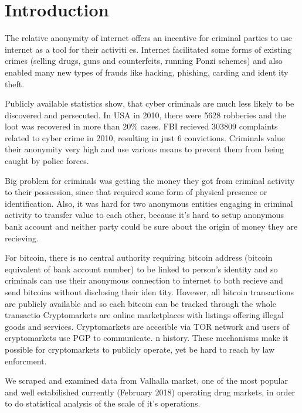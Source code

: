 \documentclass[
  digital, %
  table,   %
  lof,     %
  lot,     %
  oneside
]{fithesis3}
\begin{document}
\chapter{Introduction}

The relative anonymity of internet offers an incentive for criminal parties to use internet as a tool for their activiti
es.
Internet facilitated some forms of existing crimes (selling drugs, guns and
counterfeits, running Ponzi schemes) and also enabled many new types of frauds like hacking, phishing, carding and ident
ity theft.

Publicly available statistics show, that cyber criminals are much
 less likely to be discovered and persecuted.
 In USA in 2010, there were 5628 robberies and the loot was recovered in more than 20\% cases. \parencite{fbi10} 
 FBI recieved 303809 complaints related to cyber crime in 2010, resulting in just 6 convictions. \parencite{fbcyber} 
Criminals value their anonymity very high and use various means to prevent them from being caught by police forces.
\parencite{tzanetakis2016transparency}
\parencite{van2013surfing}
\parencite{aldridge2014not}

Big problem for criminals was getting the money they got from criminal activity to their possession,
since that required some form of physical presence or identification.
Also, it was hard for two anonymous entities engaging in criminal activity to transfer value to each other,
 because it's hard to setup anonymous bank account and neither party could be sure about the origin of
 money they are recieving.

For bitcoin, there is no central authority requiring bitcoin address
(bitcoin equivalent of bank account number) to be linked to person's identity and so 
criminals can use their anonymous connection to internet to both recieve and send bitcoins without disclosing their iden
tity.
Hovewer, all bitcoin transactions are publicly available and so each bitcoin can be tracked through the whole transactio
 Cryptomarkets are online marketplaces with listings offering illegal goods and services.
 Cryptomarkets are accesible via TOR network and users of cryptomarkets use PGP to communicate. 
n history. These mechanisms make it possible for cryptomarkets to publicly operate, yet be hard to reach by law enforcment.
\parencite{cox2016staying}

We scraped and examined data from Valhalla market,
 one of the most popular and well estabilished currently (February 2018) operating drug markets,
in order to do statistical analysis of the scale of it's operations.
\end{document}
